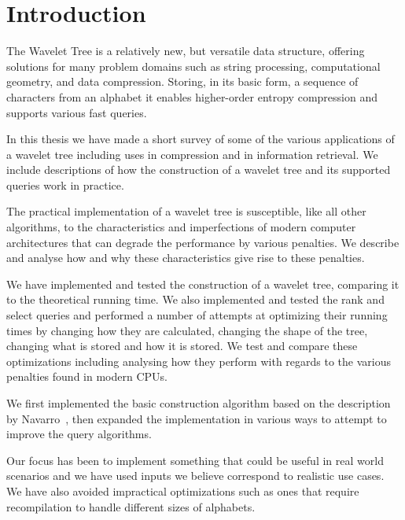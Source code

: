 \section{Introduction}
The Wavelet Tree is a relatively new, but versatile data structure, offering solutions for many problem domains such as string processing, computational geometry, and data compression.
Storing, in its basic form, a sequence of characters from an alphabet it enables higher-order entropy compression and supports various fast queries.

In this thesis we have made a short survey of some of the various applications of a wavelet tree including uses in compression and in information retrieval.
We include descriptions of how the construction of a wavelet tree and its supported queries work in practice.

The practical implementation of a wavelet tree is susceptible, like all other algorithms, to the characteristics and imperfections of modern computer architectures that can degrade the performance by various penalties.
We describe and analyse how and why these characteristics give rise to these penalties.

We have implemented and tested the construction of a wavelet tree, comparing it to the theoretical running time.
We also implemented and tested the rank and select queries and performed a number of attempts at optimizing their running times by changing how they are calculated, changing the shape of the tree, changing what is stored and how it is stored.
We test and compare these optimizations including analysing how they perform with regards to the various penalties found in modern CPUs.

We first implemented the basic construction algorithm based on the description by Navarro~, then expanded the implementation in various ways to attempt to improve the query algorithms.

Our focus has been to implement something that could be useful in real world scenarios and we have used inputs we believe correspond to realistic use cases.
We have also avoided impractical optimizations such as ones that require recompilation to handle different sizes of alphabets.